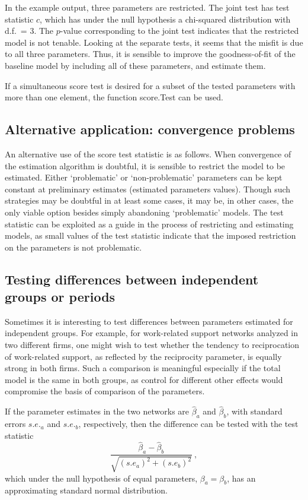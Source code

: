 \documentclass[a4paper,fleqn,11pt]{article}
\newcommand{\+}{\, + \,}
\newcommand{\sfn}[1]{\textsf{#1}}
\begin{document}
In the example output, three parameters are restricted.
The joint test has test statistic $c$, which has under the
null hypothesis a chi-squared distribution with d.f.\ = 3.
The $p$-value corresponding to the joint test indicates
that the restricted model is not tenable. Looking at the separate
tests, it seems that the misfit is due to all three parameters.
Thus, it is sensible to improve
the goodness-of-fit of the baseline model by including all of these parameters,
and estimate them.

If a simultaneous score test is desired for a subset of
the tested parameters with more than one element,
the function \sfn{score.Test} can be used.

\subsection{Alternative application: convergence problems}
\label{alternative}

An alternative use of the score test statistic is as follows. When
convergence of the estimation algorithm is doubtful, it is sensible
to restrict the model to be estimated. Either `problematic' or
`non-problematic' parameters can be kept constant at preliminary
estimates (estimated parameters values). Though such strategies may
be doubtful in at least some cases, it may be, in other cases, the
only viable option besides simply abandoning `problematic' models.
The test statistic can be exploited as a guide in the process of
restricting and estimating models, as small values of the test
statistic indicate that the imposed restriction on the parameters is
not problematic.

\subsection{Testing differences between independent groups or periods}

Sometimes it is interesting to test differences between parameters estimated for
independent groups. For example, for work-related support networks analyzed in
two different firms, one might wish to test whether the tendency to
reciprocation of work-related support, as reflected by the reciprocity
parameter, is equally strong in both firms.  Such a comparison is meaningful
especially if the total model is the same in both groups, as control for
different other effects would compromise the basis of comparison of the
parameters.

If the parameter estimates in the two networks are $\hat\beta_a$ and $\hat\beta_b$,
with standard errors $s.e._a$ and  $s.e._b$, respectively,
then the difference can be tested with the test statistic
\begin{equation}
    \frac{\hat\beta_a  - \hat\beta_b}{\sqrt{(s.e_a)^2 + (s.e_b)^2}} \ ,
\end{equation}
which under the null hypothesis of equal parameters,
$\beta_a = \beta_b$, has an approximating
standard normal distribution.
\end{document}
